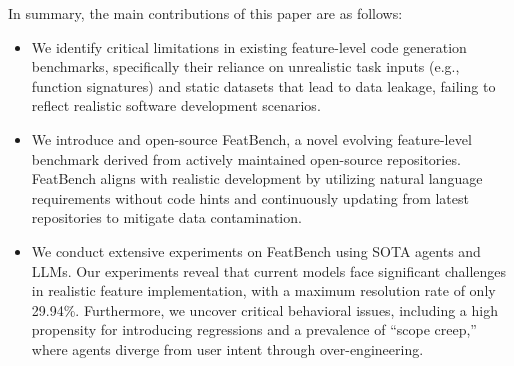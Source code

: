 In summary, the main contributions of this paper are as follows:
\begin{itemize}
    \item We identify critical limitations in existing feature-level code generation benchmarks, specifically their reliance on unrealistic task inputs (e.g., function signatures) and static datasets that lead to data leakage, failing to reflect realistic software development scenarios.
    \item We introduce and open-source FeatBench, a novel evolving feature-level benchmark derived from actively maintained open-source repositories. FeatBench aligns with realistic development by utilizing natural language requirements without code hints and continuously updating from latest repositories to mitigate data contamination.
    \item We conduct extensive experiments on FeatBench using SOTA agents and LLMs. 
    Our experiments reveal that current models face significant challenges in realistic feature implementation, with a maximum resolution rate of only 29.94\%. Furthermore, we uncover critical behavioral issues, including a high propensity for introducing regressions and a prevalence of ``scope creep,'' where agents diverge from user intent through over-engineering.
\end{itemize}